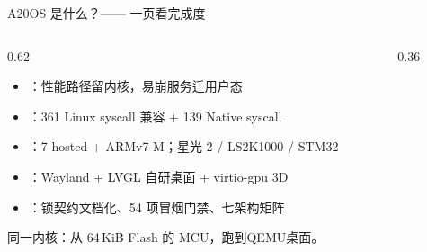 \documentclass[aspectratio=1610]{beamer}
\begin{document}
\begin{frame}{A20OS 是什么？—— 一页看完成度}
    \begin{columns}[t]
        \begin{column}{0.62\textwidth}
            \footnotesize
            \begin{itemize}
                \item {}：性能路径留内核，易崩服务迁用户态
                \item {}：361 Linux syscall 兼容 + 139 Native syscall
                \item {}：7 hosted + ARMv7-M；星光 2 / LS2K1000 / STM32
                \item {}：Wayland + LVGL 自研桌面 + virtio-gpu 3D
                \item {}：锁契约文档化、54 项冒烟门禁、七架构矩阵
            \end{itemize}
            \vspace{0.2em}
            \begin{a20keybox}
                \footnotesize 同一内核：从 64\,KiB Flash 的 MCU，跑到QEMU桌面。
            \end{a20keybox}
        \end{column}
        \begin{column}{0.36\textwidth}
            \vspace{0.3em}
            \vspace{0.3em}
        \end{column}
    \end{columns}
\end{frame}
\end{document}
